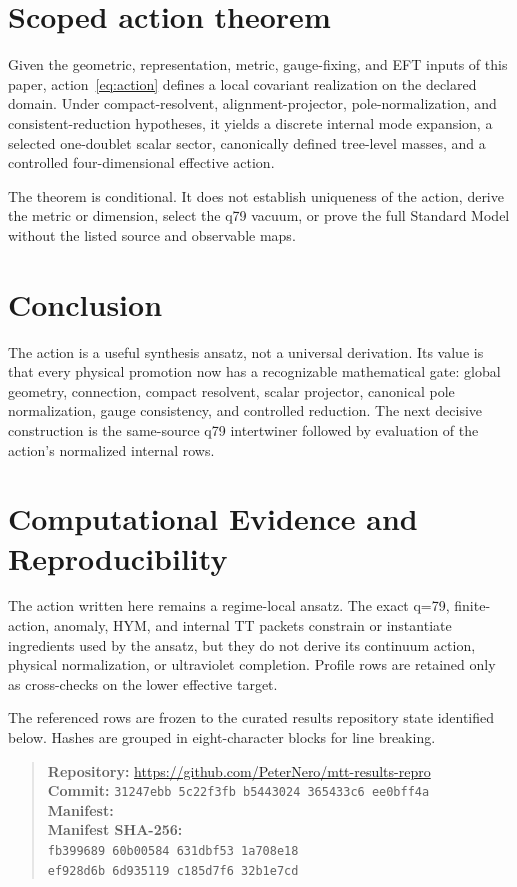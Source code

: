 \documentclass[11pt]{article}
\begin{document}
\section{Scoped action theorem}

\begin{theorem}
Given the geometric, representation, metric, gauge-fixing, and EFT inputs of
this paper, action~\eqref{eq:action} defines a local covariant realization on
the declared domain.  Under compact-resolvent, alignment-projector,
pole-normalization, and consistent-reduction hypotheses, it yields a discrete
internal mode expansion, a selected one-doublet scalar sector, canonically
defined tree-level masses, and a controlled four-dimensional effective action.
\end{theorem}

The theorem is conditional.  It does not establish uniqueness of the action,
derive the metric or dimension, select the q79 vacuum, or prove the full
Standard Model without the listed source and observable maps.

\section{Conclusion}

The action is a useful synthesis ansatz, not a universal derivation.
Its value is that every physical promotion now has a recognizable mathematical
gate: global geometry, connection, compact resolvent, scalar projector,
canonical pole normalization, gauge consistency, and controlled reduction.
The next decisive construction is the same-source q79 intertwiner followed by
evaluation of the action's normalized internal rows.

\section*{Computational Evidence and Reproducibility}
The action written here remains a regime-local ansatz. The exact q=79, finite-action, anomaly, HYM, and internal TT packets constrain or instantiate ingredients used by the ansatz, but they do not derive its continuum action, physical normalization, or ultraviolet completion. Profile rows are retained only as cross-checks on the lower effective target.

The referenced rows are frozen to the curated results repository state identified below. Hashes are grouped in eight-character blocks for line breaking.
\begin{quote}\small
\textbf{Repository:} \url{https://github.com/PeterNero/mtt-results-repro}\\
\textbf{Commit:} \texttt{31247ebb 5c22f3fb b5443024 365433c6 ee0bff4a}\\
\textbf{Manifest:} \\
\textbf{Manifest SHA-256:}\\
\texttt{fb399689 60b00584 631dbf53 1a708e18}\\
\texttt{ef928d6b 6d935119 c185d7f6 32b1e7cd}
\end{quote}
\end{document}
